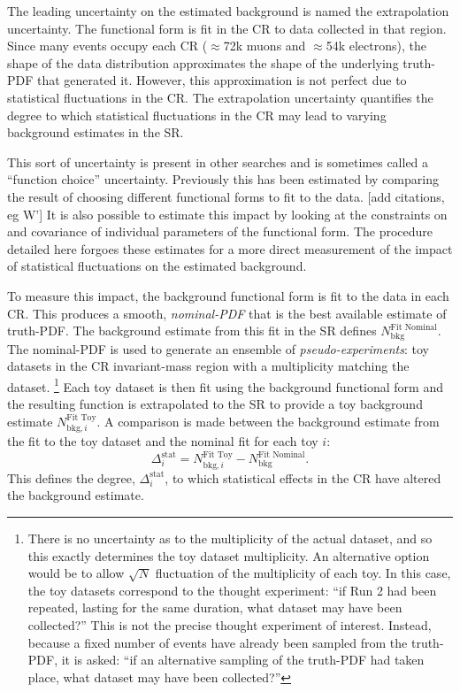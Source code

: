 The leading uncertainty on the estimated background is named the extrapolation uncertainty.
The functional form is fit in the CR to data collected in that region.
Since many events occupy each CR ($\approx$72k muons and $\approx$54k electrons), the shape of the \mll data distribution approximates the shape of the underlying truth-PDF that generated it.
However, this approximation is not perfect due to statistical fluctuations in the CR.
The extrapolation uncertainty quantifies the degree to which statistical fluctuations in the CR may lead to varying background estimates in the SR.

This sort of uncertainty is present in other searches and is sometimes called a ``function choice'' uncertainty.
Previously this has been estimated by comparing the result of choosing different functional forms to fit to the data.  {\color{red} [add citations, eg W']}
It is also possible to estimate this impact by looking at the constraints on and covariance of individual parameters of the functional form.
The procedure detailed here forgoes these estimates for a more direct measurement of the impact of statistical fluctuations on the estimated background.

To measure this impact, the background functional form is fit to the data in each CR.
This produces a smooth, \emph{nominal-PDF} that is the best available estimate of truth-PDF.
The background estimate from this fit in the SR defines $N_\text{bkg}^\text{Fit Nominal}$.
The nominal-PDF is used to generate an ensemble of \emph{pseudo-experiments}: toy datasets in the CR invariant-mass region with a multiplicity matching the dataset.
\footnote{There is no uncertainty as to the multiplicity of the actual dataset, and so this exactly determines the toy dataset multiplicity. An alternative option would be to allow $\sqrt{N}$ fluctuation of the multiplicity of each toy. In this case, the toy datasets correspond to the thought experiment: ``if Run 2 had been repeated, lasting for the same duration, what dataset may have been collected?'' This is not the precise thought experiment of interest. Instead, because a fixed number of events have already been sampled from the truth-PDF, it is asked: ``if an alternative sampling of the truth-PDF had taken place, what dataset may have been collected?''}
Each toy dataset is then fit using the background functional form and the resulting function is extrapolated to the SR to provide a toy background estimate $N_{\text{bkg},i}^\text{Fit Toy}$.
A comparison is made between the background estimate from the fit to the toy dataset and the nominal fit for each toy $i$:
\begin{equation*}
    \Delta_i^\text{stat}=N_{\text{bkg},i}^\text{Fit Toy}-N_\text{bkg}^\text{Fit Nominal}.
\end{equation*}
This defines the degree, $\Delta_i^\text{stat}$, to which statistical effects in the CR have altered the background estimate.


